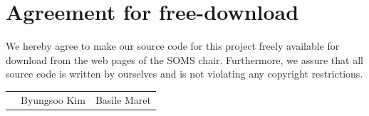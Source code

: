 \documentclass[11pt]{article}
\begin{document}

\newpage


\newpage
\section*{Agreement for free-download}
\bigskip


\bigskip


\large We hereby agree to make our source code for this project freely available for download from the web pages of the SOMS chair. Furthermore, we assure that all source code is written by ourselves and is not violating any copyright restrictions.

\begin{center}

\bigskip


\bigskip


\begin{tabular}{@{}p{3.3cm}@{}p{6cm}@{}@{}p{6cm}@{}}
\begin{minipage}{3cm}

\end{minipage}
&
\begin{minipage}{6cm}
\vspace{2mm} \large Byungsoo Kim

 \vspace{\baselineskip}

\end{minipage}
&
\begin{minipage}{6cm}

\large Basile Maret

\end{minipage}
\end{tabular}


\end{center}
\newpage







\tableofcontents

\newpage

\end{document}
